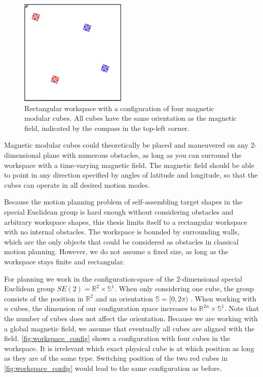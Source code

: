 \begin{figure}
	\centering
	\includegraphics[width=0.45\textwidth]{figures/workspace_config.png}
	\caption[Workspace configuration of four magnetic modular cubes]{Rectangular workspace with a configuration of four magnetic modular cubes. All cubes have the same orientation as the magnetic field, indicated by the compass in the top-left corner.}
	\label{fig:workspace_config}
\end{figure}

Magnetic modular cubes could theoretically be placed and maneuvered on any 2-dimen\-sional plane with numerous obstacles, as long as you can surround the workspace with a time-varying magnetic field.
The magnetic field should be able to point in any direction specified by angles of latitude and longitude, so that the cubes can operate in all desired motion modes.

Because the motion planning problem of self-assembling target shapes in the special Euclidean group is hard enough without considering obstacles and arbitrary workspace shapes, this thesis limits itself to a rectangular workspace with no internal obstacles.
The workspace is bounded by surrounding walls, which are the only objects that could be considered as obstacles in classical motion planning.
However, we do not assume a fixed size, as long as the workspace stays finite and rectangular.

For planning we work in the configuration-space of the 2-dimensional special Euclidean group $\textit{SE}(2) = \mathbb{R}^2 \times \mathbb{S}^1$.
When only considering one cube, the group consists of the position in $\mathbb{R}^2$ and an orientation $\mathbb{S} = [0,2\pi)$ \cite{LaValle2006}.
When working with $n$ cubes, the dimension of our configuration space increases to $\mathbb{R}^{2n} \times \mathbb{S}^1$.
Note that the number of cubes does not affect the orientation.
Because we are working with a global magnetic field, we assume that eventually all cubes are aligned with the field.
\autoref{fig:workspace_config} shows a configuration with four cubes in the workspace.
It is irrelevant which exact physical cube is at which position as long as they are of the same type.
Switching position of the two red cubes in \autoref{fig:workspace_config} would lead to the same configuration as before.

